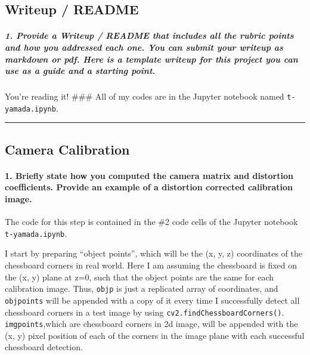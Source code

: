 \documentclass[11pt]{article}
\begin{document}
    \hypertarget{writeup-readme}{%
\subsection{Writeup / README}\label{writeup-readme}}

\hypertarget{provide-a-writeup-readme-that-includes-all-the-rubric-points-and-how-you-addressed-each-one.-you-can-submit-your-writeup-as-markdown-or-pdf.-here-is-a-template-writeup-for-this-project-you-can-use-as-a-guide-and-a-starting-point.}{%
\subparagraph{1. Provide a Writeup / README that includes all the rubric
points and how you addressed each one. You can submit your writeup as
markdown or pdf. Here is a template writeup for this project you can use
as a guide and a starting
point.}\label{provide-a-writeup-readme-that-includes-all-the-rubric-points-and-how-you-addressed-each-one.-you-can-submit-your-writeup-as-markdown-or-pdf.-here-is-a-template-writeup-for-this-project-you-can-use-as-a-guide-and-a-starting-point.}}

You're reading it! \#\#\# All of my codes are in the Jupyter notebook
named \texttt{t-yamada.ipynb}.

\begin{center}\rule{0.5\linewidth}{\linethickness}\end{center}

    \hypertarget{camera-calibration}{%
\subsection{Camera Calibration}\label{camera-calibration}}

\hypertarget{briefly-state-how-you-computed-the-camera-matrix-and-distortion-coefficients.-provide-an-example-of-a-distortion-corrected-calibration-image.}{%
\paragraph{1. Briefly state how you computed the camera matrix and
distortion coefficients. Provide an example of a distortion corrected
calibration
image.}\label{briefly-state-how-you-computed-the-camera-matrix-and-distortion-coefficients.-provide-an-example-of-a-distortion-corrected-calibration-image.}}

The code for this step is contained in the \#2 code cells of the Jupyter
notebook \texttt{t-yamada.ipynb}.

I start by preparing ``object points'', which will be the (x, y, z)
coordinates of the chessboard corners in real world. Here I am assuming
the chessboard is fixed on the (x, y) plane at z=0, such that the object
points are the same for each calibration image. Thus, \texttt{objp} is
just a replicated array of coordinates, and \texttt{objpoints} will be
appended with a copy of it every time I successfully detect all
chessboard corners in a test image by using
\texttt{cv2.findChessboardCorners()}. \texttt{imgpoints},which are
chessboard corners in 2d image, will be appended with the (x, y) pixel
position of each of the corners in the image plane with each successful
chessboard detection.
\end{document}
